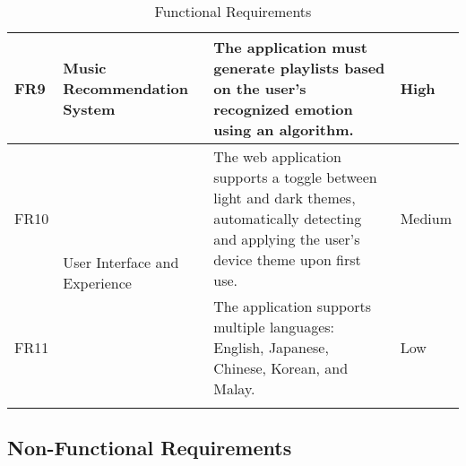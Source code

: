 \begin{longtable}{ |m{1cm}|m{3.5cm}|m{7cm}|m{1.5cm}| }
    \hline
    FR9 & Music Recommendation System & The application must generate playlists based on the user's recognized emotion using an algorithm. & High \\
    \hline
    FR10 & \multirow{2}{=}{User Interface and Experience} & The web application supports a toggle between light and dark themes, automatically detecting and applying the user's device theme upon first use. & Medium \\
    \cline{1-1} \cline{3-4}
    FR11 &  & The application supports multiple languages: English, Japanese, Chinese, Korean, and Malay. & Low \\
    \hline
    \caption{Functional Requirements} \\
\end{longtable}
\pagebreak
\subsection{Non-Functional Requirements}

